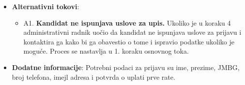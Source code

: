 \begin{itemize}
  \item \textbf{Alternativni tokovi}:
      \begin{itemize}
        \item A1. \textbf{Kandidat ne ispunjava uslove za upis.}
        Ukoliko je u koraku 4 administrativni radnik uočio da kandidat ne ispunjava uslove za prijavu i kontaktira ga kako bi ga obavestio o tome i ispravio podatke ukoliko je moguće. Proces se nastavlja u 1. koraku osnovnog toka.
      \end{itemize}

  \item \textbf{Dodatne informacije}:\newline
  Potrebni podaci za prijavu su ime, prezime, JMBG, broj telefona, imejl adresa i potvrda o uplati prve rate.
\end{itemize}



